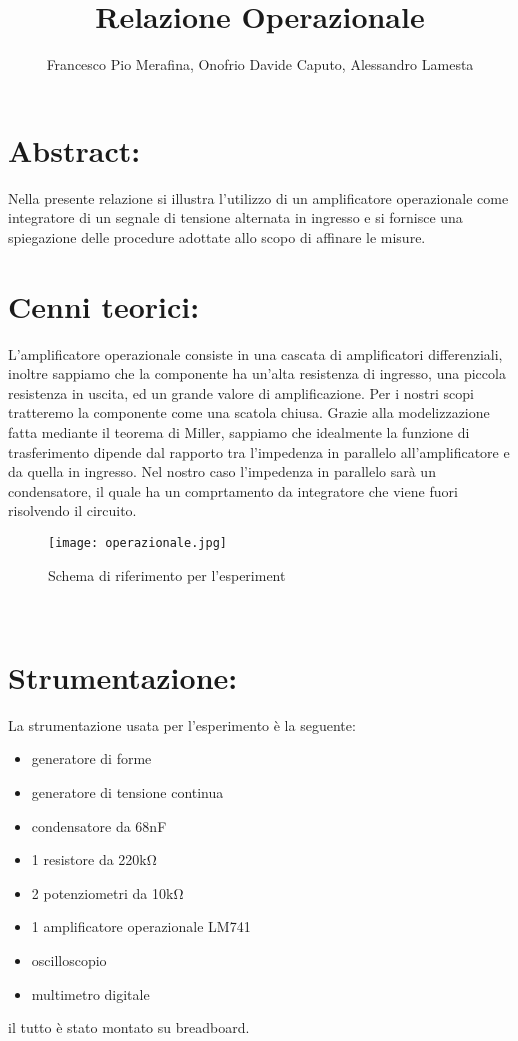 \documentclass{article}
\title{Relazione Operazionale}
\author{Francesco Pio Merafina, Onofrio Davide Caputo, Alessandro Lamesta}
\begin{document}
\maketitle

\section{Abstract:}
Nella presente relazione si illustra l’utilizzo di un amplificatore operazionale
come integratore di un segnale di tensione alternata in ingresso e si fornisce una
spiegazione delle procedure adottate allo scopo di affinare le misure.
~
\section{Cenni teorici:}
L'amplificatore operazionale consiste in una cascata di amplificatori differenziali, inoltre sappiamo che la componente ha un'alta resistenza di ingresso, una piccola resistenza in uscita, ed un grande valore di amplificazione. Per i nostri scopi tratteremo la componente come una scatola chiusa. Grazie alla modelizzazione fatta mediante il teorema di Miller, sappiamo che idealmente la funzione di trasferimento dipende dal rapporto tra l'impedenza in parallelo all'amplificatore e da quella in ingresso. Nel nostro caso l'impedenza in parallelo sarà un condensatore, il quale ha un comprtamento da integratore che viene fuori risolvendo il circuito.
~
\begin{figure}[h!]
    \centering
    \texttt{[image: operazionale.jpg]} 
    \caption{Schema di riferimento per l'esperiment}
    \label{figura1}
\end{figure}
~
\section{Strumentazione:}
La strumentazione usata per l'esperimento è la seguente:
\begin{itemize}
    \item generatore di forme 
    \item generatore di tensione continua
    \item condensatore da 68nF
    \item 1 resistore da 220kΩ
    \item 2 potenziometri da 10kΩ
    \item 1 amplificatore operazionale LM741
    \item oscilloscopio
    \item multimetro digitale
\end{itemize}
il tutto è stato montato su breadboard.
~
\end{document}
